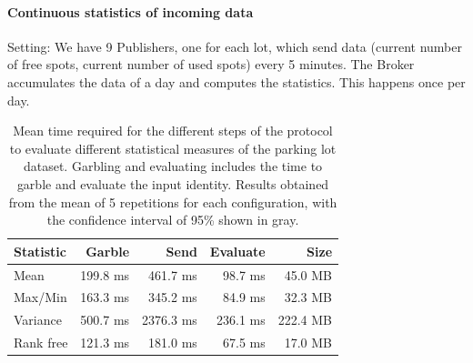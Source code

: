 \paragraph{Continuous statistics of incoming data}



Setting: We have 9 Publishers, one for each lot, which send data (current
number of free spots, current number of used spots) every 5 minutes.  The
Broker accumulates the data of a day and computes the statistics.  This
happens once per day.



\begin{table}
    \begin{tabular}{l*{3}{r}r}
    \textbf{Statistic}  & \textbf{Garble} & \textbf{Send} & \textbf{Evaluate} & \textbf{Size} \\
    \hline
    Mean       & 199.8 ms & 461.7 ms & 98.7  ms & 45.0 MB \\
    Max/Min    & 163.3 ms & 345.2 ms & 84.9  ms & 32.3 MB \\
    Variance   & 500.7 ms & 2376.3 ms & 236.1 ms & 222.4 MB \\
    \hline
    Rank free  & 121.3 ms & 181.0 ms & 67.5 ms & 17.0 MB \\
    \end{tabular}
    \caption{Mean time required for the different steps of the protocol to
      evaluate different statistical measures of the parking lot dataset.
      Garbling and evaluating includes the time to garble and evaluate the
      input identity.  Results obtained from the mean of 5 repetitions for each
      configuration, with the confidence interval of 95\% shown in gray.}
    \label{stats-times}
\end{table}

